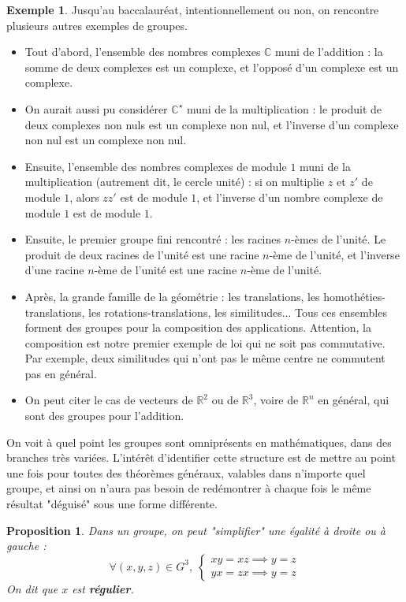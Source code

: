 \documentclass[french]{book}
\newcommand{\R}{\mathbb{R}}
\newcommand{\C}{\mathbb{C}}
\newcommand{\st}{^\star}
\theoremstyle{plain}
\newtheorem{prop}{Proposition}[chapter]
\theoremstyle{definition}
\newtheorem{exa}{Exemple}[chapter]
\theoremstyle{remark}
\begin{document}
\begin{exa}
	Jusqu'au baccalauréat, intentionnellement ou non, on rencontre plusieurs autres exemples de groupes.
	\begin{itemize}
		\item Tout d'abord, l'ensemble des nombres complexes $\C$ muni de l'addition : la somme de deux complexes est un complexe, et l'opposé d'un complexe est un complexe.
		\item On aurait aussi pu considérer $\C\st$ muni de la multiplication : le produit de deux complexes non nuls est un complexe non nul, et l'inverse d'un complexe non nul est un complexe non nul.
		\item Ensuite, l'ensemble des nombres complexes de module $1$ muni de la multiplication (autrement dit, le cercle unité) : si on multiplie $z$ et $z'$ de module $1$, alors $zz'$ est de module $1$, et l'inverse d'un nombre complexe de module $1$ est de module $1$.
		\item Ensuite, le premier groupe fini rencontré : les racines $n$-èmes de l'unité. Le produit de deux racines de l'unité est une racine $n$-ème de l'unité, et l'inverse d'une racine $n$-ème de l'unité est une racine $n$-ème de l'unité.
		\item Après, la grande famille de la géométrie : les translations, les homothéties-translations, les rotations-translations, les similitudes... Tous ces ensembles forment des groupes pour la composition des applications. Attention, la composition est notre premier exemple de loi qui ne soit pas commutative. Par exemple, deux similitudes qui n'ont pas le même centre ne commutent pas en général.
		\item On peut citer le cas de vecteurs de $\R^2$ ou de $\R^3$, voire de $\R^n$ en général, qui sont des groupes pour l'addition.
	\end{itemize}
\end{exa}
On voit à quel point les groupes sont omniprésents en mathématiques, dans des branches très variées. L'intérêt d'identifier cette structure est de mettre au point une fois pour toutes des théorèmes généraux, valables dans n'importe quel groupe, et ainsi on n'aura pas besoin de redémontrer à chaque fois le même résultat "déguisé" sous une forme différente.
\begin{prop}
	Dans un groupe, on peut "simplifier" une égalité à droite ou à gauche : $$\forall(x,y,z)\in G^3,\ \left \{ \begin{array}{ll}xy=xz\implies y=z \\ yx=zx\implies y=z\end{array}\right.$$ On dit que $x$ est \textbf{régulier}.
\end{prop}
\end{document}
